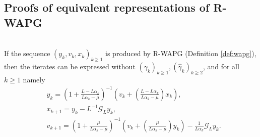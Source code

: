 \documentclass[12pt]{article}
\begin{document}
    \subsection{Proofs of equivalent representations of R-WAPG}
        \begin{proposition}\label{prop:wapg-first-equivalent-repr}\;\\
            If the sequence $(y_k, v_k, x_k)_{k \ge 1}$ is produced by R-WAPG (Definition \ref{def:wapg}), 
            then the iterates can be expressed without $(\gamma_k)_{k \ge1},(\hat \gamma_k)_{k \ge 2}$, and for all $k\ge 1$ namely
            \begin{align}
                & y_{k} = 
                \left(
                    1 + \frac{L - L\alpha_{k}}{L\alpha_{k} - \mu}
                \right)^{-1}
                \left(
                    v_{k} + 
                    \left(\frac{L - L\alpha_{k}}{L\alpha_{k} - \mu} \right) x_{k}
                \right), \label{eqn:rwapg-first-equiv-form-eqn-1}
                \\
                & x_{k + 1} = 
                y_k - L^{-1} \mathcal G_L y_k, 
                \\
                & v_{k + 1} = 
                \left(
                    1 + \frac{\mu}{L \alpha_k - \mu}
                \right)^{-1}
                \left(
                    v_k + 
                    \left(\frac{\mu}{L \alpha_k - \mu}\right) y_k
                \right) - \frac{1}{L\alpha_{k}}\mathcal G_L y_k. 
                \label{eqn:rwapg-first-equiv-form-eqn-2}
            \end{align}
        \end{proposition}
\end{document}
